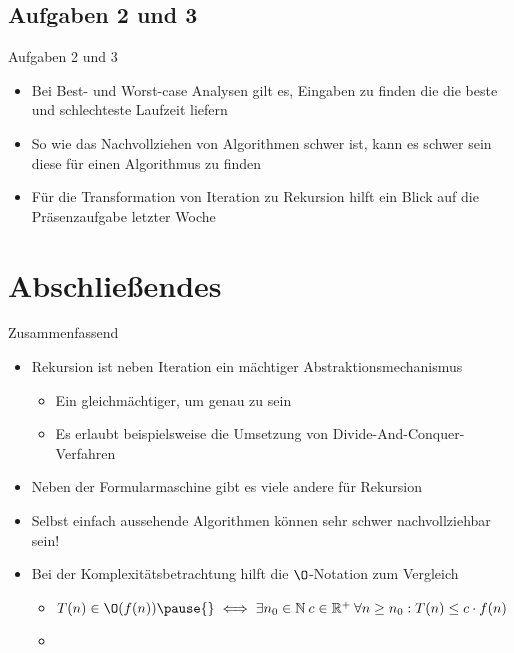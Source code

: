 \subsection{Aufgaben 2 und 3}
\begin{frame}{Aufgaben 2 und 3}
\begin{itemize}[<+(1)->]
    \itemsep12pt
    \item Bei Best- und Worst-case Analysen gilt es, Eingaben zu finden die die beste und schlechteste Laufzeit liefern
    \item So wie das Nachvollziehen von Algorithmen schwer ist, kann es schwer sein diese für einen Algorithmus zu finden 
    \item Für die Transformation von Iteration zu Rekursion hilft ein Blick auf die Präsenzaufgabe letzter Woche
\end{itemize}
\end{frame}
\fi

\section{Abschließendes}
{\SummaryFrame
\begin{frame}[t]{Zusammenfassend}
\pause \printBibCommand
\vfill\vfill %
\begin{itemize}[<+(1)->]
    \itemsep4pt
    \item Rekursion ist neben Iteration ein mächtiger Abstraktionsmechanismus \begin{itemize}
        \item Ein gleichmächtiger, um genau zu sein
        \item Es erlaubt beispielsweise die Umsetzung von Divide-And-Conquer-Verfahren
    \end{itemize}
    \item Neben der Formularmaschine gibt es viele andere  für Rekursion
    \item Selbst einfach aussehende Algorithmen können sehr schwer nachvollziehbar sein!
    \item Bei der Komplexitätsbetrachtung hilft die \(\O\)-Notation zum Vergleich \begin{itemize}
        \item \(T(n) \in \O(f(n))\pause{}\iff \exists n_0 \in \mathbb{N}\: c \in \mathbb{R}^+\: \forall n \geq n_0: T(n) \leq c \cdot f(n)\)
        \item {}
    \end{itemize}
\end{itemize}
\end{frame}
}

